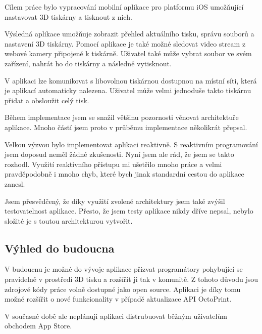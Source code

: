 Cílem práce bylo vypracování mobilní aplikace pro platformu iOS umožňující nastavovat 3D tiskárny a tisknout z nich.

Výsledná aplikace umožňuje zobrazit přehled aktuálního tisku, správu souborů a nastavení 3D tiskárny.
Pomocí aplikace je také možné sledovat video stream z webové kamery připojené k tiskárně.
Uživatel také může vybrat soubor ve svém zařízení, nahrát ho do tiskárny a následně vytisknout.

V aplikaci lze komunikovat s libovolnou tiskárnou dostupnou na místní síti, která je aplikací automaticky nalezena.
Uživatel může velmi jednoduše takto tiskárnu přidat a obsloužit celý tisk.

\bigskip

Během implementace jsem se snažil většinu pozornosti věnovat architektuře aplikace.
Mnoho částí jsem proto v průběmu implementace několikrát přepsal.

Velkou výzvou bylo implementovat aplikaci reaktivně.
S reaktivním programování jsem doposud neměl žádné zkušenosti.
Nyní jsem ale rád, že jsem se takto rozhodl.
Využití reaktivního přístupu mi ušetřilo mnoho práce a velmi pravděpodobně i mnoho chyb, které bych jinak standardní cestou do aplikace zanesl.

\bigskip

Jsem přesvědčený, že díky využití zvolené architektury jsem také zvýšil testovatelnost aplikace.
Přesto, že jsem testy aplikace nikdy dříve nepsal, nebylo složité je s toutou architekturou vytvořit.

\subsection*{Výhled do budoucna}

V budoucnu je možné do vývoje aplikace přizvat programátory pohybující se pravidelně v prostředí 3D tisku a rozšířit ji tak v komunitě.
Z tohoto důvodu jsou zdrojové kódy práce volně dostupné jako open source.
Aplikaci je díky tomu možné rozšířit o nové funkcionality v případě aktualizace API OctoPrint.

V současné době ale neplánuji aplikaci distrubuovat běžným uživatelům obchodem App Store.
